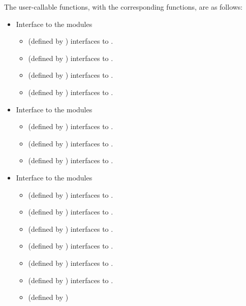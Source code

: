The user-callable functions, with the corresponding {\ida} functions,
are as follows:
\begin{itemize}
\item
  Interface to the {\nvector} modules
  \begin{itemize}
  \item {} (defined by {\nvecs})
    interfaces to .
  \item {} (defined by {\nvecp})
    interfaces to .
  \item {} (defined by {\nvecopenmp})
    interfaces to .
  \item {} (defined by {\nvecpthreads})
    interfaces to .
  \end{itemize}
\item
  Interface to the {\sunmatrix} modules
  \begin{itemize}
  \item {} (defined by {\sunmatband})
    interfaces to .
  \item {} (defined by {\sunmatdense})
    interfaces to .
  \item {} (defined by {\sunmatsparse})
    interfaces to .
  \end{itemize}
\item
  Interface to the {\sunlinsol} modules
  \begin{itemize}
  \item {} (defined by {\sunlinsolband})
    interfaces to .
  \item {} (defined by {\sunlinsoldense})
    interfaces to .
  \item {} (defined by {\sunlinsolklu})
    interfaces to .
  \item {} (defined by {\sunlinsolklu})
    interfaces to .
  \item {} (defined by {\sunlinsollapband})
    interfaces to .
  \item {} (defined by {\sunlinsollapdense})
    interfaces to .
  \item {} (defined by {\sunlinsolpcg})

\end{itemize}
\end{itemize}
